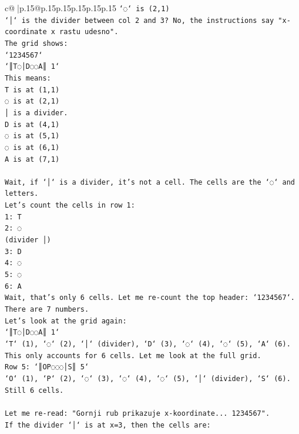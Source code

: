 \documentclass{article}
\begin{document}
{\begin{supertabular}{c@{$\;$}|p{.15\linewidth}@{}p{.15\linewidth}p{.15\linewidth}p{.15\linewidth}p{.15\linewidth}p{.15\linewidth}}
{{{\texttt{`◌` is (2,1)} \\
\texttt{`│` is the divider between col 2 and 3? No, the instructions say "x{-}coordinate x rastu udesno".} \\
\texttt{The grid shows:} \\
\texttt{`1234567`} \\
\texttt{`║T◌│D◌◌A║ 1`} \\
\texttt{This means:} \\
\texttt{T is at (1,1)} \\
\texttt{◌ is at (2,1)} \\
\texttt{│ is a divider.} \\
\texttt{D is at (4,1)} \\
\texttt{◌ is at (5,1)} \\
\texttt{◌ is at (6,1)} \\
\texttt{A is at (7,1)} \\
\\ 
\texttt{Wait, if `│` is a divider, it's not a cell. The cells are the `◌` and letters.} \\
\texttt{Let's count the cells in row 1:} \\
\texttt{1: T} \\
\texttt{2: ◌} \\
\texttt{(divider │)} \\
\texttt{3: D} \\
\texttt{4: ◌} \\
\texttt{5: ◌} \\
\texttt{6: A} \\
\texttt{Wait, that's only 6 cells. Let me re{-}count the top header: `1234567`. There are 7 numbers.} \\
\texttt{Let's look at the grid again:} \\
\texttt{`║T◌│D◌◌A║ 1`} \\
\texttt{`T` (1), `◌` (2), `│` (divider), `D` (3), `◌` (4), `◌` (5), `A` (6).} \\
\texttt{This only accounts for 6 cells. Let me look at the full grid.} \\
\texttt{Row 5: `║OP◌◌◌│S║ 5`} \\
\texttt{`O` (1), `P` (2), `◌` (3), `◌` (4), `◌` (5), `│` (divider), `S` (6).} \\
\texttt{Still 6 cells.} \\
\\ 
\texttt{Let me re{-}read: "Gornji rub prikazuje x{-}koordinate... 1234567".} \\
\texttt{If the divider `│` is at x=3, then the cells are:} \\
}}}
\end{supertabular}}
\end{document}
